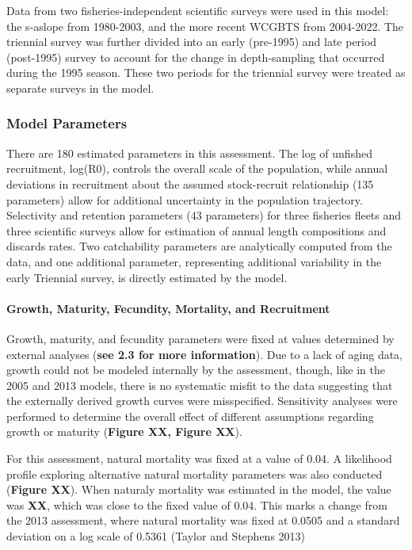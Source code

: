 \documentclass[11pt,
  english,
  letterpaper,
]{article}
\begin{document}
Data from two fisheries-independent scientific surveys were used in this model: the \gls{s-aslope} from 1980-2003, and the more recent WCGBTS from 2004-2022. The triennial survey was further divided into an early (pre-1995) and late period (post-1995) survey to account for the change in depth-sampling that occurred during the 1995 season. These two periods for the triennial survey were treated as separate surveys in the model.

\hypertarget{model-parameters}{%
\subsubsection{Model Parameters}\label{model-parameters}}

There are 180 estimated parameters in this assessment. The log of unfished recruitment, log(R0), controls the overall scale of the population, while annual deviations in recruitment about the assumed stock-recruit relationship (135 parameters) allow for additional uncertainty in the population trajectory. Selectivity and retention parameters (43 parameters) for three fisheries fleets and three scientific surveys allow for estimation of annual length compositions and discards rates. Two catchability parameters are analytically computed from the data, and one additional parameter, representing additional variability in the early Triennial survey, is directly estimated by the model.

\hypertarget{growth-maturity-fecundity-mortality-and-recruitment}{%
\paragraph{Growth, Maturity, Fecundity, Mortality, and Recruitment}\label{growth-maturity-fecundity-mortality-and-recruitment}}

Growth, maturity, and fecundity parameters were fixed at values determined by external analyses (\textbf{see 2.3 for more information}). Due to a lack of aging data, growth could not be modeled internally by the assessment, though, like in the 2005 and 2013 models, there is no systematic misfit to the data suggesting that the externally derived growth curves were misspecified. Sensitivity analyses were performed to determine the overall effect of different assumptions regarding growth or maturity (\textbf{Figure XX, Figure XX}).

For this assessment, natural mortality was fixed at a value of 0.04. A likelihood profile exploring alternative natural mortality parameters was also conducted (\textbf{Figure XX}). When naturaly mortality was estimated in the model, the value was \textbf{XX}, which was close to the fixed value of 0.04. This marks a change from the 2013 assessment, where natural mortality was fixed at 0.0505 and a standard deviation on a log scale of 0.5361 (Taylor and Stephens 2013)
\end{document}
